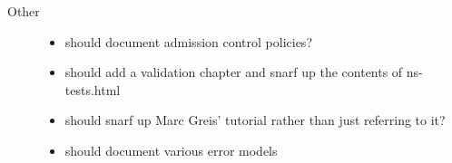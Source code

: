 \begin{description}
\item[Other]

        \begin{itemize}
        \item should document admission control policies?
        \item should add a validation chapter and snarf
                up the contents of ns-tests.html
        \item should snarf up Marc Greis' tutorial
                rather than just referring to it?
        \item should document various error models
        \end{itemize}

\end{description}

